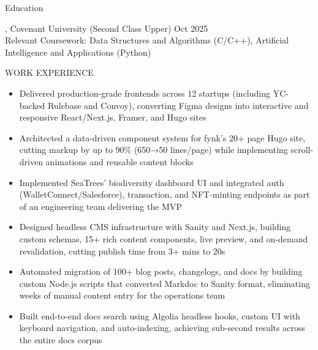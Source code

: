 \documentclass{resume}
\begin{document}
\begin{rSection}{Education}

    , Covenant University (Second Class Upper) \hfill {Oct 2025}  \\
    Relevant Coursework: Data Structures and Algorithms (C/C++), Artificial Intelligence and Applications (Python)
    \end{rSection}
 


\begin{rSection}{WORK EXPERIENCE}

\begin{itemize}
    \itemsep -3pt {}
     \item Delivered production-grade frontends across 12 startups (including YC-backed Rulebase and Convoy), converting Figma designs into interactive and responsive React/Next.js, Framer, and Hugo sites
     \item Architected a data-driven component system for fynk's 20+ page Hugo site, cutting markup by up to 90\% (650→50 lines/page) while implementing scroll-driven animations and reusable content blocks
    \item Implemented SeaTrees' biodiversity dashboard UI and integrated auth (WalletConnect/Salesforce), transaction, and NFT-minting endpoints as part of an engineering team delivering the MVP
 \end{itemize}

\begin{itemize}
    \itemsep -3pt {}
    \item Designed headless CMS infrastructure with Sanity and Next.js, building custom schemas, 15+ rich content components, live preview, and on-demand revalidation, cutting publish time from 3+ mins to 20s
     \item Automated migration of 100+ blog posts, changelogs, and docs by building custom Node.js scripts that converted Markdoc to Sanity format, eliminating weeks of manual content entry for the operations team
    \item Built end-to-end docs search using Algolia headless hooks, custom UI with keyboard navigation, and auto-indexing, achieving sub-second results across the entire docs corpus
 \end{itemize}


\end{rSection}
\end{document}
